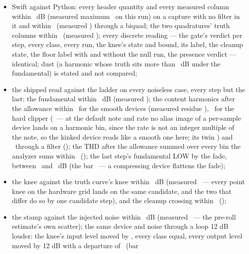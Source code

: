 \documentclass[11pt,a4paper]{article}
\begin{document}
{\sloppy
\begin{itemize}
  \item Swift against Python: every header quantity and every measured
  column within \cparitySwiftTolerance\ dB (measured maximum
  \cparityWorstSwift\ on this run) on a capture with no filter in it and
  within \cparitySwiftFilteredTolerance\ (measured
  \cparityWorstSwiftFiltered) through a biquad; the two quadratures'
  truth columns within \cparitySwiftTruthTolerance\ (measured
  \cparityWorstSwiftTruth); every discrete reading --- the gate's
  verdict per step, every class, every run, the knee's state and bound,
  its label, the cleanup state, the floor label with and without the
  null run, the presence verdict --- identical; dust (a harmonic whose
  truth sits more than \cparityEmptyDepth\ dB under the fundamental) is
  stated and not compared;
  \item the shipped read against the ladder on every noiseless case,
  every step but the last: the fundamental within \cparityHOne\ dB
  (measured \cparityWorstHOne); the content harmonics after the
  allowance within \cparityTruthSmooth\ for the smooth devices (measured
  residue \cparityWorstResidueSmooth), \cparityTruthKinked\ for the hard
  clipper (\cparityWorstResidueKinked\ --- at the default note and rate no
  alias image of a per-sample device lands on a harmonic bin, since the
  rate is not an integer multiple of the note, so the kinked device reads
  like a smooth one here; its twin \cparityWorstResiduePhantom) and
  \cparityTruthFiltered\ through a filter (\cparityWorstResidueFiltered);
  the THD after the allowance summed over every bin the analyzer sums
  within \cparityTHD\ (\cparityWorstTHDResidue); the last step's
  fundamental LOW by the fade, between \cparityWorstFade\ and
  \cparityLeastFade\ dB (the bar \cparityFade\ --- a compressing device
  flattens the fade);
  \item the knee against the truth curve's knee within \cparityKnee\ dB
  (measured \cparityWorstKnee\ --- every point knee on the hardware grid
  lands on the same candidate, and the two that differ do so by one
  candidate step), and the cleanup crossing within \cparityCleanup\
  (\cparityWorstCleanup);
  \item the stamp against the injected noise within \cparityStamp\ dB
  (measured \cparityStampError\ --- the pre-roll estimate's own scatter);
  the same device and noise through a loop 12 dB louder: the knee's input
  level moved by \cparityGainKneeMove, every class equal, every output
  level moved by 12 dB with a departure of \cparityGainShift\ (bar

\end{itemize}}
\end{document}
